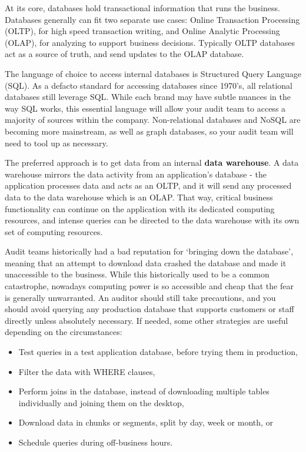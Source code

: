 \documentclass[
]{book}
\providecommand{\tightlist}{%
  \setlength{\itemsep}{0pt}\setlength{\parskip}{0pt}}
\begin{document}
At its core, databases hold transactional information that runs the business. Databases generally can fit two separate use cases: Online Transaction Processing (OLTP), for high speed transaction writing, and Online Analytic Processing (OLAP), for analyzing to support business decisions. Typically OLTP databases act as a source of truth, and send updates to the OLAP database.

The language of choice to access internal databases is Structured Query Language (SQL). As a defacto standard for accessing databases since 1970's, all relational databases still leverage SQL. While each brand may have subtle nuances in the way SQL works, this essential language will allow your audit team to access a majority of sources within the company. Non-relational databases and NoSQL are becoming more mainstream, as well as graph databases, so your audit team will need to tool up as necessary.

The preferred approach is to get data from an internal \textbf{data warehouse}. A data warehouse mirrors the data activity from an application's database - the application processes data and acts as an OLTP, and it will send any processed data to the data warehouse which is an OLAP. That way, critical business functionality can continue on the application with its dedicated computing resources, and intense queries can be directed to the data warehouse with its own set of computing resources.

Audit teams historically had a bad reputation for `bringing down the database', meaning that an attempt to download data crashed the database and made it unaccessible to the business. While this historically used to be a common catastrophe, nowadays computing power is so accessible and cheap that the fear is generally unwarranted. An auditor should still take precautions, and you should avoid querying any production database that supports customers or staff directly unless absolutely necessary. If needed, some other strategies are useful depending on the circumstances:

\begin{itemize}
\tightlist
\item
  Test queries in a test application database, before trying them in production,
\item
  Filter the data with WHERE clauses,
\item
  Perform joins in the database, instead of downloading multiple tables individually and joining them on the desktop,
\item
  Download data in chunks or segments, split by day, week or month, or
\item
  Schedule queries during off-business hours.
\end{itemize}
\end{document}
